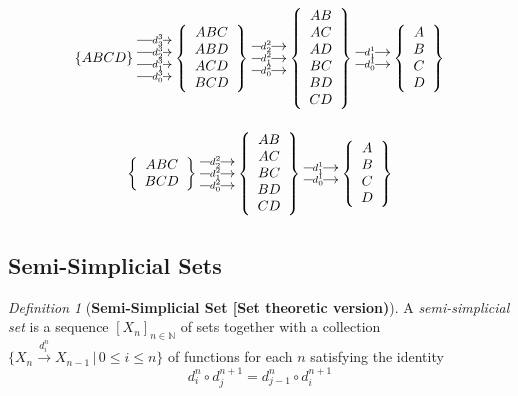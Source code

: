 \documentclass[10pt]{article}
\newcommand{\onearrow}[3]{\mbox{$#1 \stackrel{#2}{\longrightarrow} #3$}}
\theoremstyle{remark}
\newtheorem{definition}{Definition}
\begin{document}
$$
\xymatrix{
\{ABCD\} \ar@<3ex>[r]|{d_3^3}  \ar@<1 ex>[r]|{d_2^3}  \ar@<-1ex>[r]|{d_1^3}  \ar@<-3 ex>[r]|{d_0^3} &
     \left\{ {\begin{array}{c} ABC \\ ABD \\ ACD \\ BCD \end{array}} \right\} \ar@<2ex>[r]|{d_2^2}  \ar[r]|{d_1^2} \ar@<-2 ex>[r]|{d_0^2} &
     \left\{ {\begin{array}{c} AB \\ AC \\ AD \\ BC \\ BD \\ CD \end{array}} \right\} \ar@<1ex>[r]|{d_1^1} \ar@<-1ex>[r]|{d_0^1} &
     \left\{ {\begin{array}{c} A \\ B \\ C \\ D \end{array}} \right\}
}
$$

$$
\xymatrix{
     \left\{ {\begin{array}{c} ABC \\ BCD \end{array}} \right\} \ar@<2ex>[r]|{d_2^2}  \ar[r]|{d_1^2} \ar@<-2 ex>[r]|{d_0^2} &
     \left\{ {\begin{array}{c} AB \\ AC \\ BC \\ BD \\ CD \end{array}} \right\} \ar@<1ex>[r]|{d_1^1} \ar@<-1ex>[r]|{d_0^1} &
     \left\{ {\begin{array}{c} A \\ B \\ C \\ D \end{array}} \right\}
}
$$



\subsection{Semi-Simplicial Sets}

\begin{definition}[\textbf{Semi-Simplicial Set [Set theoretic version)}]
A \emph{semi-simplicial set} is a sequence $[X_n]_{n \in \mathbb{N}}$ of sets together with a collection $\{ \onearrow{X_n}{d_i^n}{X_{n-1}} \, | \, 0 \leq i \leq n \}$ of functions for each $n$ satisfying the identity
$$
d_i^n \circ d_j^{n+1} = d_{j-1}^n \circ d_i^{n+1}
$$
\end{definition}
\end{document}
